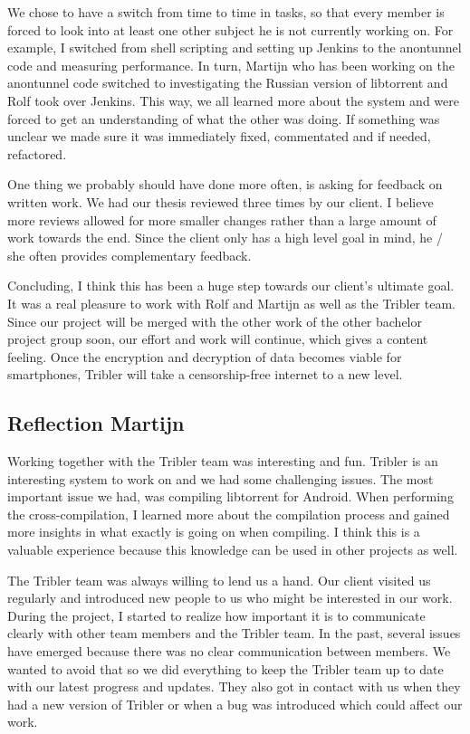 			
			We chose to have a switch from time to time in tasks, so that every member is forced to look into at least one other subject he is not currently working on. For example, I switched from shell scripting and setting up Jenkins to the anontunnel code and measuring performance. In turn, Martijn who has been working on the anontunnel code switched to investigating the Russian version of libtorrent and Rolf took over Jenkins. This way, we all learned more about the system and were forced to get an understanding of what the other was doing. If something was unclear we made sure it was immediately fixed, commentated and if needed, refactored.
			
			
			One thing we probably should have done more often, is asking for feedback on written work. We had our thesis reviewed three times by our client. I believe more reviews allowed for more smaller changes rather than a large amount of work towards the end. Since the client only has a high level goal in mind, he / she often provides complementary feedback.
			
			
			Concluding, I think this has been a huge step towards our client's ultimate goal. It was a real pleasure to work with Rolf and Martijn as well as the Tribler team. Since our project will be merged with the other work of the other bachelor project group soon, our effort and work will continue, which gives a content feeling. Once the encryption and decryption of data becomes viable for smartphones, Tribler will take a censorship-free internet to a new level.
		
		\subsection{Reflection Martijn}
			Working together with the Tribler team was interesting and fun. Tribler is an interesting system to work on and we had some challenging issues. The most important issue we had, was compiling libtorrent for Android. When performing the cross-compilation, I learned more about the compilation process and gained more insights in what exactly is going on when compiling. I think this is a valuable experience because this knowledge can be used in other projects as well.
		
			The Tribler team was always willing to lend us a hand. Our client visited us regularly and introduced new people to us who might be interested in our work. During the project, I started to realize how important it is to communicate clearly with other team members and the Tribler team. In the past, several issues have emerged because there was no clear communication between members. We wanted to avoid that so we did everything to keep the Tribler team up to date with our latest progress and updates. They also got in contact with us when they had a new version of Tribler or when a bug was introduced which could affect our work.
		
